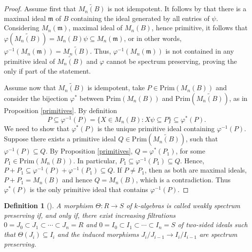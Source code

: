 \documentclass[oneside, a4paper, 11pt]{amsart}
\newtheorem{definition}[theorem]{Definition }
\newcommand{\Prim}{\mathrm{Prim}}
\begin{document}
 \begin{proof}
Assume first that $\widetilde{M_n(B)}$ is not idempotent. It follows by \cite[Proposition 2.5(6)]{CKLS} that there is a maximal ideal $\mathfrak{m}$ of $B$ containing the ideal generated by all entries of $\psi$. Considering $M_n(\mathfrak{m})$, maximal ideal of $M_n(B)$, hence primitive, it follows that $\varphi(\widetilde{M_n(B)}) = M_n(B)\psi \subseteq M_n(\mathfrak{m})$, or in other words, $\varphi^{-1}(M_n(\mathfrak{m}))=\widetilde{M_n(B)}$. Thus, $\varphi^{-1}(M_n(\mathfrak{m}))$  is not contained in any primitive ideal of $\widetilde{M_n(B)}$ and $\varphi$ cannot be spectrum preserving, proving the only if part of the statement.

Assume now that $\widetilde{M_n(B)}$ is idempotent, take $P\in \Prim(M_n(B))$ and consider the bijection $\varphi^*$ between $\Prim(M_n(B))$ and $\Prim(\widetilde{M_n(B)})$, as in Proposition \ref{primitives}. By definition
$$P\subseteq \varphi^{-1}(P)=\{ X\in M_n(B) : X\psi \subseteq P\}\subseteq \varphi^*(P).$$
We need to show that $\varphi^*(P)$ is the unique primitive ideal containing $\varphi^{-1}(P)$. Suppose there exists a primitive ideal $Q\in \Prim(\widetilde{M_n(B)})$, such that $\varphi^{-1}(P)\subseteq Q$. By Proposition \ref{primitives}, $Q=\varphi^*(P_1)$, for some $P_1\in \Prim(M_n(B))$. In particular, $P_1\subseteq \varphi^{-1}(P_1) \subseteq Q$. Hence,  $P+P_1 \subseteq \varphi^{-1}(P) + \varphi^{-1}(P_1) \subseteq Q$. If $P\neq P_1$, then as both are maximal ideals, $P+P_1=M_n(B)$ and hence $Q=M_n(B)$, which is a contradiction. Thus  $\varphi^*(P)$ is the only primitive ideal that contains $\varphi^{-1}(P)$.
\end{proof}

\begin{definition}[\cite{BN}]
A morphism $\Theta: R\to S$ of $k$-algebras is called \emph{weakly spectrum preserving} if, and only if, there exist increasing filtrations
$0 = J_0 \subset J_1 \subset \cdots \subset J_n = R$ and 
$0 = I_0 \subset I_1\subset \cdots \subset I_n = S$ 
of two-sided ideals such that $\Theta(J_i)\subseteq I_i$ and the induced morphisms $J_i/J_{i-1} \to I_i/I_{i-1}$ are spectrum preserving.     
\end{definition}
\end{document}
